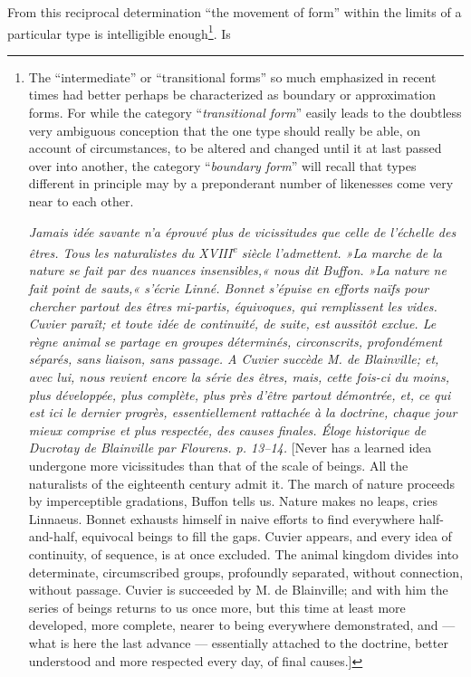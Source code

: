 \documentclass[12pt,a4paper]{book}
\begin{document}
\setcounter{footnote}{0}
From this reciprocal determination ``the movement of form'' within the limits of a
particular type is intelligible enough\footnote{The ``intermediate'' or ``transitional
forms'' so much emphasized in recent times had better perhaps be characterized as
boundary or approximation forms. For while the category ``\emph{transitional form}''
easily leads to the doubtless very ambiguous conception that the one type should really
be able, on account of circumstances, to be altered and changed until it at last passed
over into another, the category ``\emph{boundary form}'' will recall that types
different in principle may by a preponderant number of likenesses come very near to
each other.
\par \textit{Jamais idée savante n'a éprouvé plus de vicissitudes que celle de
\emph{l'échelle des êtres}. Tous les naturalistes du XVIII\textsuperscript{e} siècle
l'admettent. »La marche de la nature se fait par des nuances insensibles,« nous dit
Buffon. »La nature ne fait point de sauts,« s'écrie Linné. Bonnet s'épuise en efforts
naïfs pour chercher partout des êtres \emph{mi-partis, équivoques}, qui remplissent
\emph{les vides}. Cuvier paraît; et toute idée de continuité, de suite, est aussitôt
exclue. Le règne animal se partage en groupes déterminés, circonscrits, profondément
séparés, sans liaison, sans passage. A Cuvier succède M. de Blainville; et, avec lui,
nous revient encore \emph{la série des êtres}, mais, cette fois-ci du moins, plus
développée, plus complète, plus près d'être partout démontrée, et, ce qui est ici le
dernier progrès, essentiellement rattachée à la doctrine, chaque jour mieux comprise et
plus respectée, des \emph{causes finales}. Éloge historique de Ducrotay de Blainville
par Flourens. p. 13--14.} [Never has a learned idea undergone more vicissitudes than
that of the scale of beings. All the naturalists of the eighteenth century admit it.
The march of nature proceeds by imperceptible gradations, Buffon tells us. Nature makes
no leaps, cries Linnaeus. Bonnet exhausts himself in naive efforts to find everywhere
half-and-half, equivocal beings to fill the gaps. Cuvier appears, and every idea of
continuity, of sequence, is at once excluded. The animal kingdom divides into
determinate, circumscribed groups, profoundly separated, without connection, without
passage. Cuvier is succeeded by M. de Blainville; and with him the series of beings
returns to us once more, but this time at least more developed, more complete, nearer
to being everywhere demonstrated, and --- what is here the last advance --- essentially
attached to the doctrine, better understood and more respected every day, of final
causes.]}. Is
\end{document}
